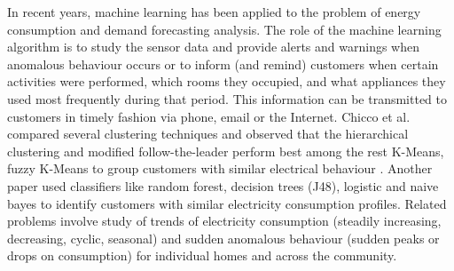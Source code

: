 \documentclass[conference]{IEEEtran}
\begin{document}
In recent years, machine learning has been applied to the problem of energy consumption and demand forecasting analysis. The role of the machine learning algorithm is to study the sensor data and provide alerts and warnings when anomalous behaviour occurs or to inform (and remind) customers when certain activities were performed, which rooms they occupied, and what appliances they used most frequently during that period. This information can be transmitted to customers in timely fashion via phone, email or the Internet.
Chicco et al. \cite{1626400} compared several clustering techniques and observed that the hierarchical clustering and modified follow-the-leader perform best among the rest K-Means, fuzzy K-Means to group customers with similar electrical behaviour \cite{5620917}. Another paper \cite{Wijaya} used classifiers like random forest, decision trees (J48), logistic and naive bayes to identify customers with similar electricity consumption profiles.
Related problems involve study of trends of electricity consumption (steadily increasing, decreasing, cyclic, seasonal) and sudden anomalous behaviour (sudden peaks or drops on consumption) for individual homes and across the community.\cite{Diane}
\end{document}
